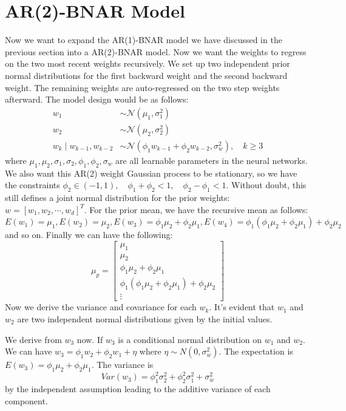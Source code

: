 \documentclass{article}
\begin{document}
\section{AR(2)-BNAR Model}
Now we want to expand the AR(1)-BNAR model we have discussed in the previous section into a AR(2)-BNAR model. Now we want the weights to regress on the two most recent weights recursively. We set up two independent prior normal distributions for the first backward weight and the second backward weight. The remaining weights are auto-regressed on the two step weights afterward. The model design would be as follows:
$$
\begin{aligned}
w_1 & \sim \mathcal{N}\left(\mu_1, \sigma_1^2\right) \\
w_2 & \sim \mathcal{N}\left(\mu_2, \sigma_2^2\right) \\
w_k \mid w_{k-1}, w_{k-2} & \sim \mathcal{N}\left(\phi_1 w_{k-1}+\phi_2 w_{k-2}, \sigma_w^2\right), \quad k \geq 3
\end{aligned}
$$ where $\mu_1, \mu_2, \sigma_1, \sigma_2, \phi_1, \phi_2, \sigma_w$ are all learnable parameters in the neural networks. We also want this AR(2) weight Gaussian process to be stationary, so we have the constraints $\phi_2 \in(-1,1), \quad \phi_1+\phi_2<1, \quad \phi_2-\phi_1<1$. Without doubt, this still defines a joint normal distribution for the prior weights: $w=[w_1,w_2,\cdots,w_d]^T$. For the prior mean, we have the recursive mean as follows: $E(w_1)=\mu_1, E(w_2)=\mu_2, E(w_3)=\phi_1\mu_2+\phi_2\mu_1, E(w_4)=\phi_1(\phi_1\mu_2+\phi_2\mu_1)+\phi_2\mu_2$ and so on. Finally we can have the following:
$$
\mu_p=\left[\begin{array}{c}
\mu_1 \\
\mu_2 \\
\phi_1 \mu_2+\phi_2 \mu_1 \\
\phi_1\left(\phi_1 \mu_2+\phi_2 \mu_1\right)+\phi_2 \mu_2 \\
\vdots
\end{array}\right]
$$
Now we derive the variance and covariance for each $w_k$. It's evident that $w_1$ and $w_2$ are two independent normal distributions given by the initial values. 

We derive from $w_3$ now. If $w_3$ is a conditional normal distribution on $w_1$ and $w_2$. We can have $w_3=\phi_1w_2+\phi_2w_1+\eta$ where $\eta \sim N(0, \sigma^2_w)$. The expectation is $E(w_3)=\phi_1\mu_2+\phi_2\mu_1$. The variance is $$Var(w_3)=\phi_1^2\sigma^2_2+\phi^2_2\sigma_1^2+\sigma_w^2$$ by the independent assumption leading to the additive variance of each component.
\end{document}
